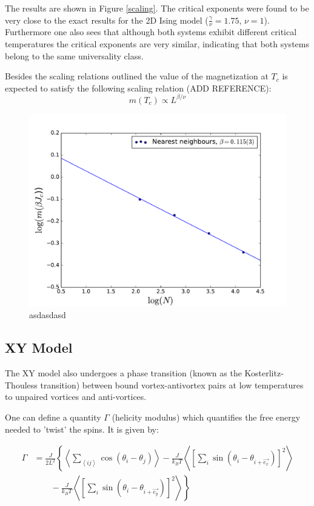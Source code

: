 \documentclass[twoside]{article}
\def\mean#1{\left< #1 \right>}
\begin{document}
\begin{multicols}{2}
The results are shown in Figure \ref{scaling}. The critical exponents were found to be very close to the exact results for the 2D Ising model ($\frac{\gamma}{\nu} = 1.75$, $\nu = 1$). Furthermore one also sees that although both systems exhibit different critical temperatures the critical exponents are very similar, indicating that both systems belong to the same universality class.

Besides the scaling relations outlined the value of the magnetization at $T_c$ is expected to satisfy the following scaling relation (ADD REFERENCE):
\begin{equation}
m(T_c) \propto L^{\beta/\nu}
\end{equation}

\begin{figure}[H]
\centering
\includegraphics[scale=0.4]{images/plot_magnetization.pdf}
\caption{asdasdasd}
\end{figure}

\subsection{XY Model}
The XY model also undergoes a phase transition (known as the Kosterlitz-Thouless transition) between bound vortex-antivortex pairs at low temperatures to unpaired vortices and anti-vortices. 

One can define a quantity $\Gamma$ (helicity modulus) which quantifies the free energy needed to 'twist' the spins. It is given by:

\begin{align}
\Gamma &= \frac{J}{2L^2}\left\{ \mean{\sum_{\mean{ij}} \cos(\theta_i - \theta_j)} - \frac{J}{k_B T} \mean{\left[ \sum_i \sin( \theta_i - \theta_{i+ \vec{e_x}}) \right]^2}\right.\nonumber \\
 &\qquad \left. {}  - \frac{J}{k_B T} \mean{\left[ \sum_i \sin( \theta_i - \theta_{i+ \vec{e_y}}) \right]^2} \right\}
\end{align}


\end{multicols}
\end{document}
